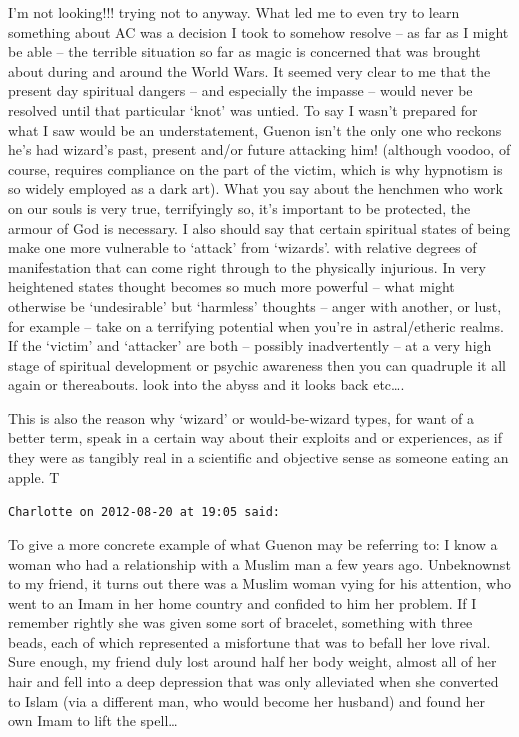\begin{footnotesize}
\begin{sffamily}
I'm not looking!!! trying not to anyway. What led me to even try to learn something about AC was a decision I took to somehow resolve – as far as I might be able – the terrible situation so far as magic is concerned that was brought about during and around the World Wars. It seemed very clear to me that the present day spiritual dangers – and especially the impasse – would never be resolved until that particular `knot' was untied. To say I wasn't prepared for what I saw would be an understatement, Guenon isn't the only one who reckons he's had wizard's past, present and/or future attacking him! (although voodoo, of course, requires compliance on the part of the victim, which is why hypnotism is so widely employed as a dark art). What you say about the henchmen who work on our souls is very true, terrifyingly so, it's important to be protected, the armour of God is necessary. I also should say that certain spiritual states of being make one more vulnerable to `attack' from `wizards'. with relative degrees of manifestation that can come right through to the physically injurious. In very heightened states thought becomes so much more powerful – what might otherwise be `undesirable' but `harmless' thoughts – anger with another, or lust, for example – take on a terrifying potential when you're in astral/etheric realms. If the `victim' and `attacker' are both – possibly inadvertently – at a very high stage of spiritual development or psychic awareness then you can quadruple it all again or thereabouts. look into the abyss and it looks back etc….

This is also the reason why `wizard' or would-be-wizard types, for want of a better term, speak in a certain way about their exploits and or experiences, as if they were as tangibly real in a scientific and objective sense as someone eating an apple. T


\hfill

\texttt{Charlotte on 2012-08-20 at 19:05 said: }

To give a more concrete example of what Guenon may be referring to: I know a woman who had a relationship with a Muslim man a few years ago. Unbeknownst to my friend, it turns out there was a Muslim woman vying for his attention, who went to an Imam in her home country and confided to him her problem. If I remember rightly she was given some sort of bracelet, something with three beads, each of which represented a misfortune that was to befall her love rival. Sure enough, my friend duly lost around half her body weight, almost all of her hair and fell into a deep depression that was only alleviated when she converted to Islam (via a different man, who would become her husband) and found her own Imam to lift the spell…



\end{sffamily}
\end{footnotesize}
